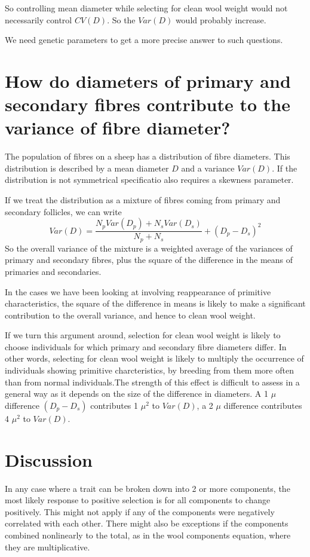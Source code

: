 \documentclass[titlepage]{article}  %
\begin{document}
So controlling mean diameter while selecting for clean wool weight would not necessarily control $CV(D)$. So the $Var{(D)}$ would probably increase.

We need genetic parameters to get a more precise answer to such questions.

\section{ How do diameters of primary and secondary fibres contribute to the variance of fibre diameter?}

The population of fibres on a sheep has a distribution of fibre diameters. This distribution is described by a mean diameter $D$ and a variance $Var{(D)}$. If the distribution is not symmetrical specificatio also requires a skewness parameter.

If we treat the distribution as a mixture of fibres coming from primary and secondary follicles, we can write
\begin{displaymath}
Var{(D)} = \frac{N_{p} Var{(D_{p})} + N_{s} Var{(D_{s})}}{N_{p} + N_{s}} + (D_{p} - D_{s})^{2}
\end{displaymath}
So the overall variance of the mixture is a weighted average of the variances of primary and secondary fibres, plus the square of the difference in the means of primaries and secondaries. 

In the cases we have been looking at involving  reappearance of primitive characteristics, the square of the difference in means is likely to make a significant contribution to the overall variance, and hence to clean wool weight. 


If we turn this argument around, selection for clean wool weight is likely to choose individuals for which primary and secondary fibre diameters differ. In other words, selecting for clean wool weight is likely to multiply the occurrence of individuals showing primitive charcteristics, by breeding from them more often than from normal individuals.The strength of this effect is difficult to assess in a general way as it depends on the size of the difference in diameters.  A 1 $\mu$ difference $(D_{p} - D_{s})$ contributes 1 $\mu^{2}$ to $Var{(D)}$, a 2 $\mu$ difference contributes 4 $\mu^{2}$ to $Var{(D)}$. 

\section{Discussion}
In any case where a trait can be broken down into 2 or more components, the most likely response to positive selection is for all components to change positively. This might not apply if any of the components were negatively correlated with each other.  There might also be exceptions if the components combined nonlinearly to the total, as in the wool components equation, where they are multiplicative. 
\end{document}

